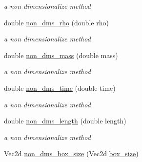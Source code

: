 \begin{CompactItemize}
\begin{CompactList}\small\item\em a non dimensionalize method \item\end{CompactList}\item 
\hypertarget{classInitiation_29245385c400c4f0de40707cb07dc0dd}{
double \hyperlink{classInitiation_29245385c400c4f0de40707cb07dc0dd}{non\_\-dms\_\-rho} (double rho)}
\label{classInitiation_29245385c400c4f0de40707cb07dc0dd}

\begin{CompactList}\small\item\em a non dimensionalize method \item\end{CompactList}\item 
\hypertarget{classInitiation_e39448af30a53dd8f4354492be9883fc}{
double \hyperlink{classInitiation_e39448af30a53dd8f4354492be9883fc}{non\_\-dms\_\-mass} (double mass)}
\label{classInitiation_e39448af30a53dd8f4354492be9883fc}

\begin{CompactList}\small\item\em a non dimensionalize method \item\end{CompactList}\item 
\hypertarget{classInitiation_2ec28f27a197bfaeb3937733dbb47b03}{
double \hyperlink{classInitiation_2ec28f27a197bfaeb3937733dbb47b03}{non\_\-dms\_\-time} (double time)}
\label{classInitiation_2ec28f27a197bfaeb3937733dbb47b03}

\begin{CompactList}\small\item\em a non dimensionalize method \item\end{CompactList}\item 
\hypertarget{classInitiation_921fe74dff7653520c5e72cc5c11b353}{
double \hyperlink{classInitiation_921fe74dff7653520c5e72cc5c11b353}{non\_\-dms\_\-length} (double length)}
\label{classInitiation_921fe74dff7653520c5e72cc5c11b353}

\begin{CompactList}\small\item\em a non dimensionalize method \item\end{CompactList}\item 
\hypertarget{classInitiation_1b13c381a36c5d841bf9b4dc108a03f6}{
Vec2d \hyperlink{classInitiation_1b13c381a36c5d841bf9b4dc108a03f6}{non\_\-dms\_\-box\_\-size} (Vec2d \hyperlink{classInitiation_c4ab38f327f64513f4c21cd5781f508a}{box\_\-size})}
\label{classInitiation_1b13c381a36c5d841bf9b4dc108a03f6}


\end{CompactItemize}
